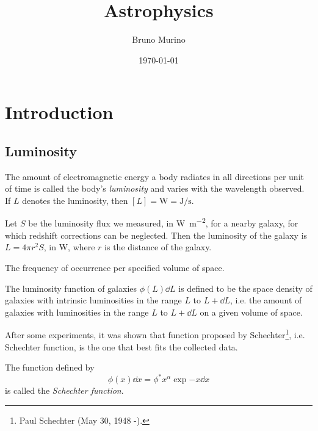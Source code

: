 \documentclass{_mypackages/monograph}
\title{Astrophysics} %
\author{Bruno Murino} %
\date{\today} %
\begin{document}
\frontmatter

\monographtp
\dominitoc
\doparttoc
\pagestyle{onlypagenum}
\tableofcontents
\mainmatter

\chapter{Introduction}

\section{Luminosity}

\begin{definition}[Luminosity]
The amount of electromagnetic energy a body radiates in all directions per unit of time is called the body's \emph{luminosity} and varies with the wavelength observed. If \(L\) denotes the luminosity, then \([L] = \si{\watt} = \si{\joule\per\second}\).
\end{definition}

Let \(S\) be the luminosity flux we measured, in \si{\watt\per\metre\squared}, for a nearby galaxy, for which redshift corrections can be neglected. Then the luminosity of the galaxy is \(L = 4\pi r^2 S\), in \si{\watt}, where \(r\) is the distance of the galaxy.

\begin{definition}
The frequency of occurrence per specified volume of space.
\end{definition}

\begin{definition}
The luminosity function of galaxies \(\phi(L)\dd{L}\) is defined to be the space density of galaxies with intrinsic luminosities in the range \(L\) to \(L + \dd{L}\), i.e. the amount of galaxies with luminosities in the range \(L\) to \(L + \dd{L}\) on a given volume of space.
\end{definition}

After some experiments, it was shown that function proposed by Schechter\footnote{Paul Schechter (May 30, 1948 -).}, i.e. Schechter function, is the one that best fits the collected data.

\begin{definition}
The function defined by
\begin{equation}
    \phi(x)\dd{x} = \phi^* x^\alpha \exp{-x}\dd{x}
\end{equation}
is called the \emph{Schechter function}.
\end{definition}
\end{document}
